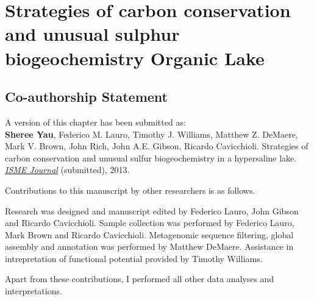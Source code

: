 \chapter{Strategies of carbon conservation and unusual sulphur biogeochemistry Organic Lake}
\label{ch:org}
\acresetall

\section*{Co-authorship Statement}
A version of this chapter has been submitted as:\\

\textbf{Sheree Yau}, Federico M. Lauro, Timothy J. Williams, Matthew Z. DeMaere, Mark V. Brown, John Rich, 
John A.E. Gibson, Ricardo Cavicchioli. 
Strategies of carbon conservation and unusual sulfur biogeochemistry in a hypersaline lake.
\emph{\underline{ISME Journal}}
(submitted), 2013.

Contributions to this manuscript by other researchers is as follows.

Research was designed and manuscript edited by Federico Lauro, John Gibson and Ricardo Cavicchioli.
Sample collection was performed by Federico Lauro, Mark Brown and Ricardo Cavicchioli.
Metagenomic sequence filtering, global assembly and annotation was performed by Matthew DeMaere.
Assistance in intrepretation of functional potential provided by Timothy Williams.

Apart from these contributions, I performed all other data analyses and interpretations.
\newpage


